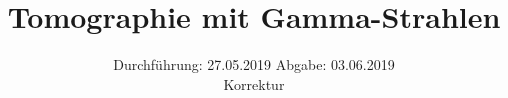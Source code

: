 

\subject{V14}
\title{Tomographie mit Gamma-Strahlen}
\date{%
  Durchführung: 27.05.2019
  \hspace{3em}
  Abgabe: 03.06.2019 \\
  Korrektur
}



\maketitle
\thispagestyle{empty}
\tableofcontents
\newpage






\printbibliography{}


